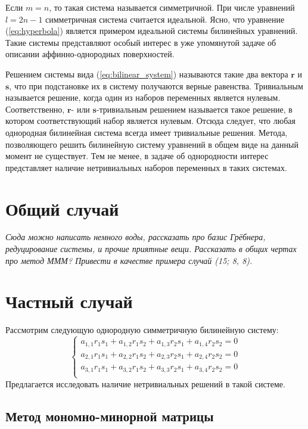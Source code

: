 Если $m = n$, то такая система называется симметричной. При числе уравнений $l = 2n - 1$ симметричная 
система считается идеальной. Ясно, что уравнение (\ref{eq:hyperbola}) является примером идеальной системы 
билинейных уравнений. Такие системы представляют особый интерес в уже упомянутой задаче об описании 
аффинно-однородных поверхностей. 

Решением системы вида (\ref{eq:bilinear_system}) называются такие два вектора $\mathbf{r}$ и $
\mathbf{s}$, что при подстановке их в систему получаются верные равенства. Тривиальным называется 
решение, когда один из наборов переменных является нулевым. Соответственно, $\mathbf{r}$- или $
\mathbf{s}$-тривиальным решением называется такое решение, в котором соответствующий набор является 
нулевым. Отсюда следует, что любая однородная билинейная система всегда имеет тривиальные решения. 
Метода, позволяющего решить билинейную систему уравнений в общем виде на данный момент не существует. 
Тем не менее, в задаче об однородности интерес представляет наличие нетривиальных наборов переменных 
в таких системах. 

\section{Общий случай} 
\textit{Сюда можно написать немного воды, рассказать про базис Грёбнера, редуцирование системы, и прочие 
приятные вещи. Рассказать в общих чертах про метод МММ? Привести в качестве примера случай (15; 8, 8).}

\section{Частный случай}

Рассмотрим следующую однородную симметричную билинейную систему: 
\begin{equation}\label{eq:trivial}
	\begin{cases}
		a_{1,1} r_1 s_1 + a_{1,2} r_1 s_2 + a_{1,3} r_2 s_1 + a_{1,4} r_2 s_2 = 0 \\
		a_{2,1} r_1 s_1 + a_{2,2} r_1 s_2 + a_{2,3} r_2 s_1 + a_{2,4} r_2 s_2 = 0 \\
		a_{3,1} r_1 s_1 + a_{3,2} r_1 s_2 + a_{3,3} r_2 s_1 + a_{3,4} r_2 s_2 = 0 \\
	\end{cases}
\end{equation}
Предлагается исследовать наличие нетривиальных решений в такой системе.

\subsection{Метод мономно-минорной матрицы}

